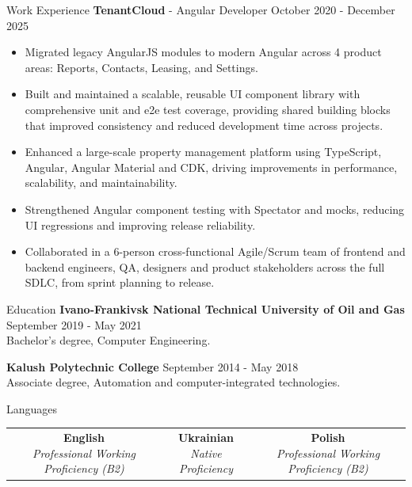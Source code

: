 \documentclass{resume}
\begin{document}
\begin{rSection}{Work Experience}
    {\fontsize{12pt}{14pt}\selectfont \bf TenantCloud}{ - Angular Developer} \hfill {October 2020 - December 2025} \\
    \vspace{-6mm}
    \begin{itemize} \itemsep -4pt
        \item Migrated legacy AngularJS modules to modern Angular across 4 product areas: Reports, Contacts, Leasing, and Settings.
        \item Built and maintained a scalable, reusable UI component library with comprehensive unit and e2e test coverage, providing shared building blocks that improved consistency and reduced development time across projects.
        \item Enhanced a large-scale property management platform using TypeScript, Angular, Angular Material and CDK, driving improvements in performance, scalability, and maintainability.
        \item Strengthened Angular component testing with Spectator and mocks, reducing UI regressions and improving release reliability.
        \item Collaborated in a 6-person cross-functional Agile/Scrum team of frontend and backend engineers, QA, designers and product stakeholders across the full SDLC, from sprint planning to release.
     \end{itemize}
    \vspace{0.1mm}
\end{rSection}

\vspace{-2mm}
\begin{rSection}{Education}
    {\bf Ivano-Frankivsk National Technical University of Oil and Gas} \hfill {September 2019 - May 2021}
    \\ Bachelor’s degree, Computer Engineering.

    \vspace{-0.5mm}

    {\bf Kalush Polytechnic College} \hfill {September 2014 - May 2018} \\ Associate degree, Automation and computer-integrated technologies.
    \vspace{-0.5mm}
\end{rSection}

\vspace{-2mm}
\begin{rSection}{Languages}
    \begin{center}
        \setlength{\tabcolsep}{16pt}
        \begin{tabular}{ c | c | c }
            \makecell{\textbf{English} \\ \textit{Professional Working Proficiency (B2)}} &
            \makecell{\textbf{Ukrainian} \\ \textit{Native Proficiency}} &
            \makecell{\textbf{Polish} \\ \textit{Professional Working Proficiency (B2)}}
        \end{tabular}
    \end{center}
\end{rSection}
\end{document}
